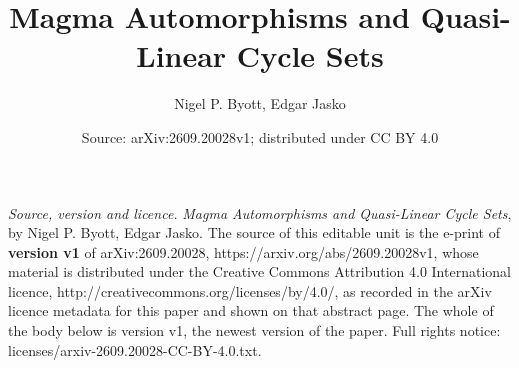 \documentclass[10pt,a4paper]{amsart}
\numberwithin{equation}{section}
\theoremstyle{definition}
\begin{document}
\title{Magma Automorphisms and Quasi-Linear Cycle Sets}
\author{Nigel P. Byott, Edgar Jasko}
\date{Source: arXiv:2609.20028v1; distributed under CC BY 4.0}
\maketitle
\noindent\emph{Source, version and licence.} \emph{Magma Automorphisms and Quasi-Linear Cycle Sets}, by Nigel P. Byott, Edgar Jasko. The source of this editable unit is the e-print of \textbf{version v1} of arXiv:2609.20028, https://arxiv.org/abs/2609.20028v1, whose material is distributed under the Creative Commons Attribution 4.0 International licence, http://creativecommons.org/licenses/by/4.0/, as recorded in the arXiv licence metadata for this paper and shown on that abstract page. The whole of the body below is version v1, the newest version of the paper. Full rights notice: licenses/arxiv-2609.20028-CC-BY-4.0.txt.\par\smallskip
\end{document}
